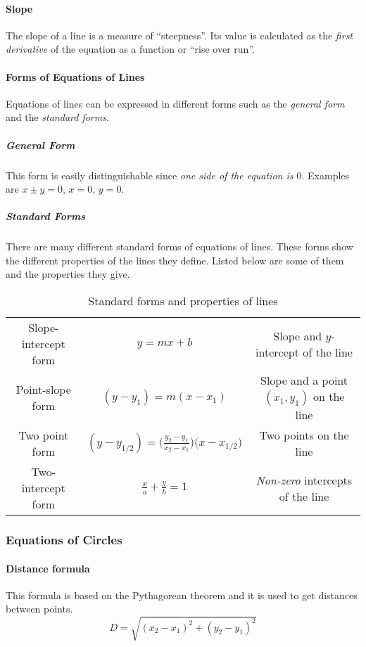 \paragraph{Slope}
The slope of a line is a measure of ``steepness''.
Its value is calculated as the \emph{first derivative} of the equation as a function or ``rise over run''.

\paragraph{Forms of Equations of Lines}
Equations of lines can be expressed in different forms such as the \emph{general form} and the \emph{standard forms}.

\subparagraph{General Form}
This form is easily distinguishable since \emph{one side of the equation is $0$}. 
Examples are $x \pm y = 0$, $x = 0$, $y = 0$.

\subparagraph{Standard Forms}
There are many different standard forms of equations of lines.
These forms show the different properties of the lines they define.
Listed below are some of them and the properties they give.

\begin{table}[h!]
  \centering
  \caption{Standard forms and properties of lines}
  \begin{tabular}{c|c|c}
    Slope-intercept form & $y = mx + b$ & Slope and $y$-intercept of the line \\
    Point-slope form & $(y-y_1) = m(x-x_1)$ & Slope and a point $(x_1, y_1)$ on the line \\
    Two point form & $(y-y_{1/2}) = \big(\frac{y_2-y_1}{x_2-x_1}\big)\big(x-x_{1/2}\big)$ & Two points on the line \\
    Two-intercept form & $\frac{x}{a} + \frac{y}{b}=1$ & \emph{Non-zero} intercepts of the line
  \end{tabular}
\end{table}

\subsubsection{Equations of Circles}

\paragraph{Distance formula}
This formula is based on the Pythagorean theorem and it is used to get distances between points.
$$D = \sqrt{(x_2-x_1)^2 + (y_2-y_1)^2}$$

